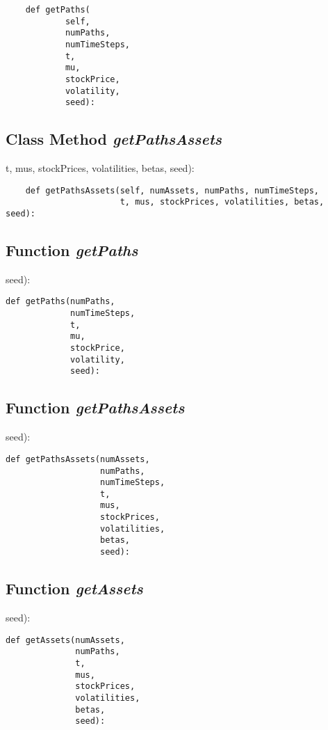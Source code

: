 \documentclass[twoside,11pt]{book}
\begin{document}
\begin{lstlisting}
    def getPaths(
            self,
            numPaths,
            numTimeSteps,
            t,
            mu,
            stockPrice,
            volatility,
            seed):
\end{lstlisting}

\subsection{Class Method {\it getPathsAssets}}
t, mus, stockPrices, volatilities, betas, seed):

\begin{lstlisting}
    def getPathsAssets(self, numAssets, numPaths, numTimeSteps,
                       t, mus, stockPrices, volatilities, betas, seed):
\end{lstlisting}

\subsection{Function {\it getPaths}}
seed):

\begin{lstlisting}
def getPaths(numPaths,
             numTimeSteps,
             t,
             mu,
             stockPrice,
             volatility,
             seed):
\end{lstlisting}

\subsection{Function {\it getPathsAssets}}
seed):

\begin{lstlisting}
def getPathsAssets(numAssets,
                   numPaths,
                   numTimeSteps,
                   t,
                   mus,
                   stockPrices,
                   volatilities,
                   betas,
                   seed):
\end{lstlisting}

\subsection{Function {\it getAssets}}
seed):

\begin{lstlisting}
def getAssets(numAssets,
              numPaths,
              t,
              mus,
              stockPrices,
              volatilities,
              betas,
              seed):
\end{lstlisting}
\end{document}
